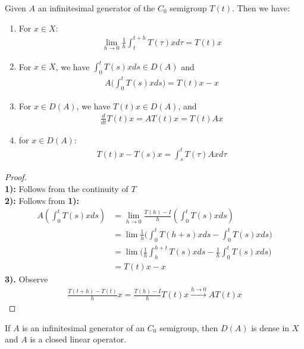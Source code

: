 \begin{theorem}
	Given $A$ an infinitesimal generator of the $C_0$ semigroup $T(t)$. Then we have:
	\begin{enumerate}
		\item For $x \in X$:
		\begin{align*}
			\lim_{h \rightarrow 0} \frac{1}{h} \int_{t}^{t + h} T(\tau) x d\tau = T(t) x 
		\end{align*}
		\item For $x \in X$, we have $ \int_0^t T(s) xds \in D(A)$ and
		\begin{align*}
			A\bigg(\int_0^tT(s)xds\bigg) = T(t)x - x
		\end{align*}
		\item
		For $x \in D(A)$, we have $T(t)x \in D(A)$, and 
		\begin{align*}
			\frac{d}{dt} T(t) x = AT(t) x  = T(t) Ax
		\end{align*}
		\item for $x \in D(A)$:
		\begin{align*}
			T(t)x - T(s)x = \int_s^t T(\tau)A x d\tau
		\end{align*}
	\end{enumerate}
\end{theorem}
\begin{proof}
\quad\\
\textbf{1):} Follows from the continuity of $T$\\
\textbf{2):} Follows from \textbf{1):}
\begin{align*}
	A(\int_0^t T(s)x ds ) &= \lim_{h \rightarrow 0} \frac{T(h) - I}{h}(\int_0^t T(s) x ds)\\
	&= \lim \frac{1}{h} \bigg( \int_0^tT(h + s) x ds  - \int_0^t T(s)x ds \bigg)\\
	&= \lim \bigg( \frac{1}{h} \int_h^{h + t} T(s) x ds  - \frac{1}{h} \int_0^t T(s) xds \bigg)\\
	&= T(t)x - x 
\end{align*}
\textbf{3).} Observe
\begin{align*}
	\frac{T(t + h) - T(t)}{h} x = \frac{T(h) - I}{h} T(t)x \overset{h \rightarrow 0}{\longrightarrow} AT(t)x
\end{align*}
\end{proof}


\begin{corollary}
	If $A$ is an infinitesimal generator of an $C_0$ semigroup, then $D(A)$ is dense in $X$ and $A$ is a closed linear operator.
\end{corollary}

